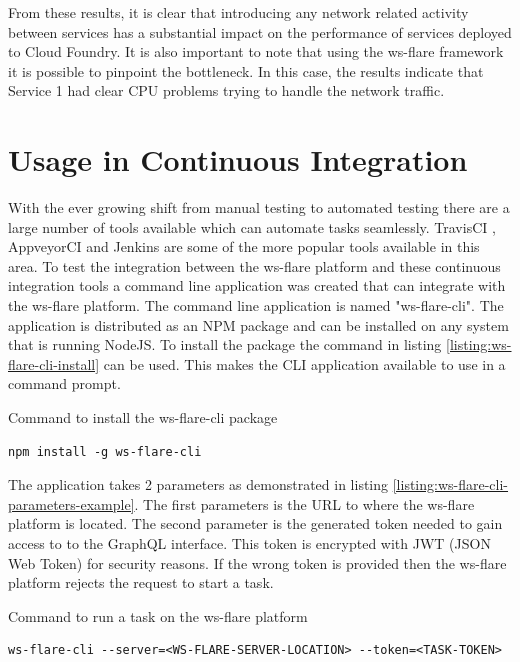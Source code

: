 From these results, it is clear that introducing any network related activity between services has a substantial impact on the performance of services deployed to Cloud Foundry. It is also important to note that using the ws-flare framework it is possible to pinpoint the bottleneck. In this case, the results indicate that Service 1 had clear CPU problems trying to handle the network traffic.

\section{Usage in Continuous Integration}

With the ever growing shift from manual testing to automated testing there are a large number of tools available which can automate tasks seamlessly. TravisCI \cite{travisCI}, AppveyorCI \cite{appveyorCI} and Jenkins \cite{jenkinsCi} are some of the more popular tools available in this area. To test the integration between the ws-flare platform and these continuous integration tools a command line application was created that can integrate with the ws-flare platform. The command line application is named "ws-flare-cli". The application is distributed as an NPM package and can be installed on any system that is running NodeJS. To install the package the command in listing \ref{listing:ws-flare-cli-install} can be used. This makes the CLI application available to use in a command prompt.

\begin{listing}[H]
    \caption{Command to install the ws-flare-cli package}
    \label{listing:ws-flare-cli-install}
    \begin{verbatim}
npm install -g ws-flare-cli
\end{verbatim}
\end{listing}

The application takes 2 parameters as demonstrated in listing \ref{listing:ws-flare-cli-parameters-example}. The first parameters is the URL to where the ws-flare platform is located. The second parameter is the generated token needed to gain access to to the GraphQL interface. This token is encrypted with JWT (JSON Web Token) for security reasons. If the wrong token is provided then the ws-flare platform rejects the request to start a task.

\begin{listing}[H]
    \caption{Command to run a task on the ws-flare platform}
    \label{listing:ws-flare-cli-parameters-example}
    \begin{verbatim}
ws-flare-cli --server=<WS-FLARE-SERVER-LOCATION> --token=<TASK-TOKEN>
\end{verbatim}
\end{listing}


